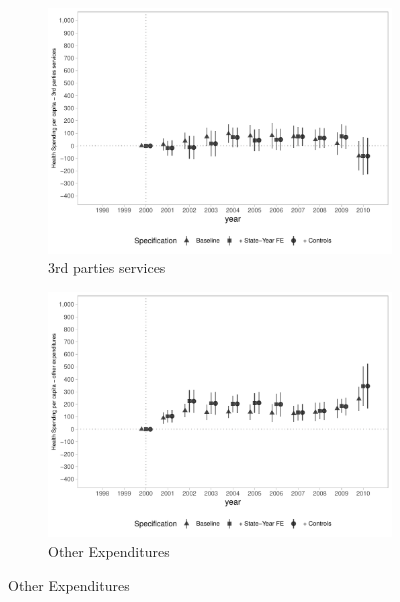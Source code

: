 \begin{figure}[h]
\begin{center}
\begin{subfigure}{0.48\textwidth}
    \end{subfigure}
    \begin{subfigure}{0.48\textwidth}
        \centering
        \caption{\scriptsize 3rd parties services}\label{fig:siops3_c}
        \includegraphics[width=\textwidth]{plots/spending/siops_despservicoster_pcapita_dist_ec29_baseline_dist_ec29_baseline_full.pdf}
    \end{subfigure}
    \begin{subfigure}{0.48\textwidth}
        \centering
        \caption{\scriptsize Other Expenditures}\label{fig:siops3_d}
        \includegraphics[width=\textwidth]{plots/spending/siops_despoutros_pcapita_dist_ec29_baseline_dist_ec29_baseline_full.pdf}
    \end{subfigure}
    
    \end{center}
    
\end{figure}

